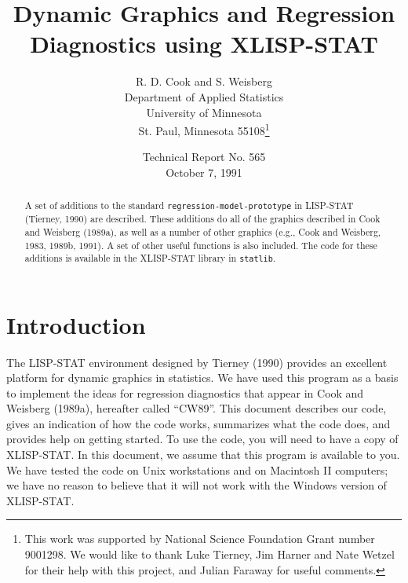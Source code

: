 \setlength{\textwidth}{6in}          %
\setlength{\textheight}{8.75in}
\setlength{\topmargin}{-0.25in}
\setlength{\oddsidemargin}{0.25in}

\newcommand{\inv}{^{-1}}
\newcommand{\xtxinv}{\mbox{$(X^{T}X)\inv$}}
\newcommand{\betahat} {\mbox{$\hat{\beta}$}}
\newcommand{\gammahat}{\mbox{$\hat{\gamma}$}}
\newcommand{\sigmahat}{\mbox{$\hat{\sigma}$}}
\newcommand{\yhat}{\mbox{$\hat{y}$}}
\newcommand{\var}{\mbox{var}}
\newenvironment{references}{%
  \section{References}%
    \begin{list}%
            {}%
            {\setlength{\leftmargin}{.25in}\setlength{\itemindent}{-.25in}}}%
   {\end{list}}
\title{Dynamic Graphics and Regression Diagnostics using XLISP-STAT}
\author{
R. D. Cook  and  S. Weisberg \\
Department of Applied Statistics \\
University of Minnesota \\
St. Paul, Minnesota 55108\thanks{ This work was supported by National
Science Foundation Grant number 9001298.  We would like to thank Luke Tierney,
Jim Harner and Nate Wetzel for their help with this project, and Julian
Faraway for useful comments.}}
\date{Technical Report No. 565\\October 7, 1991}

\maketitle

\begin{abstract}
A set of additions to the standard {\tt regression-model-prototype} in
LISP-STAT (Tierney, 1990) are described.  These additions do all of the
graphics described in Cook and Weisberg (1989a), as well as a number of
other graphics (e.g., Cook and Weisberg, 1983, 1989b, 1991).  
A set of other useful functions is also included.  The code 
for these additions is available in the XLISP-STAT library in {\tt statlib}.
\end{abstract}

\section{Introduction}
The LISP-STAT environment designed by Tierney (1990) provides an excellent
platform for dynamic graphics in statistics.  We have used this program
as a basis to implement the ideas for regression diagnostics that appear in
Cook and Weisberg (1989a), hereafter called ``CW89''.  
This document describes our code, gives an
indication of how the code works, summarizes what the code does, and provides
help on getting started.	To use the code, you will need to have
a copy of XLISP-STAT.  In this document, we assume that this program is
available to you.  We have tested the code on Unix workstations and on
Macintosh II computers; we have no reason to believe that it will not work
with the Windows version of XLISP-STAT.

